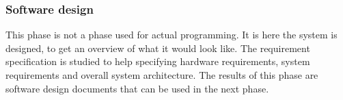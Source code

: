 \subsubsection{Software design}


This phase is not a phase used for actual programming. It is here the system is designed, to get an overview of what it would look like\cite{waterfallexplained}. The requirement specification is studied to help specifying hardware requirements, system requirements and overall system architecture\cite{waterfallexplained}.  The results of this phase are software design documents that can be used in the next phase\cite{waterfallexplained}.